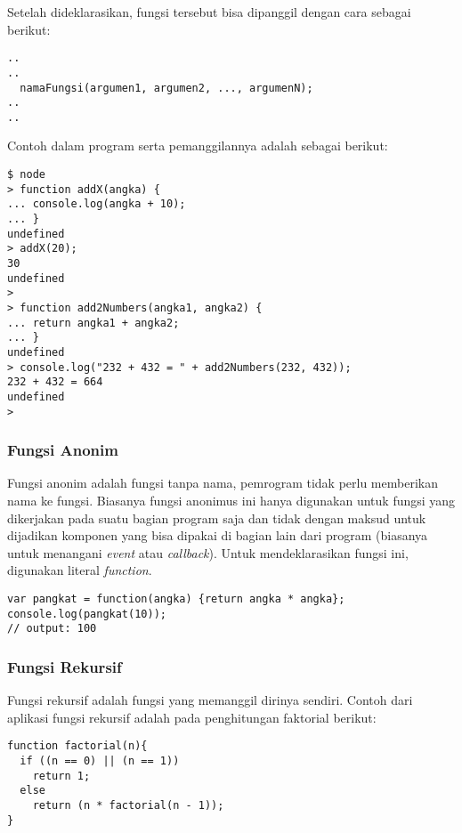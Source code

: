 Setelah dideklarasikan, fungsi tersebut bisa dipanggil dengan cara sebagai berikut:

\lstset{language=JavaScript,caption=Pemanggilan Fungsi dalam JavaScript}
\begin{lstlisting}
..
..
  namaFungsi(argumen1, argumen2, ..., argumenN);
..
..
\end{lstlisting}

Contoh dalam program serta pemanggilannya adalah sebagai berikut:

\lstset{language=bash,caption=Contoh deklarasi fungsi dan pemanggilannya}
\begin{lstlisting}
$ node
> function addX(angka) {
... console.log(angka + 10);
... }
undefined
> addX(20);
30
undefined
>
> function add2Numbers(angka1, angka2) {
... return angka1 + angka2;
... }
undefined
> console.log("232 + 432 = " + add2Numbers(232, 432));
232 + 432 = 664
undefined
>
\end{lstlisting}

\subsubsection{Fungsi Anonim}

Fungsi anonim adalah fungsi tanpa nama, pemrogram tidak perlu memberikan nama ke fungsi. Biasanya fungsi anonimus ini hanya digunakan untuk fungsi yang dikerjakan pada suatu bagian program saja dan tidak dengan maksud untuk dijadikan komponen yang bisa dipakai di bagian lain dari program (biasanya untuk menangani \textit{event} atau \textit{callback}). Untuk mendeklarasikan fungsi ini, digunakan literal \textit{function}.

\lstset{language=JavaScript,caption=Fungsi anonim}
\begin{lstlisting}
var pangkat = function(angka) {return angka * angka};
console.log(pangkat(10));
// output: 100
\end{lstlisting}

\subsubsection{Fungsi Rekursif}

Fungsi rekursif adalah fungsi yang memanggil dirinya sendiri. Contoh dari aplikasi fungsi rekursif adalah pada penghitungan faktorial berikut:

\lstset{language=JavaScript,caption=Fungsi rekursif untuk menghitung faktorial}
\begin{lstlisting}
function factorial(n){
  if ((n == 0) || (n == 1))
    return 1;
  else
    return (n * factorial(n - 1));
}
\end{lstlisting}

